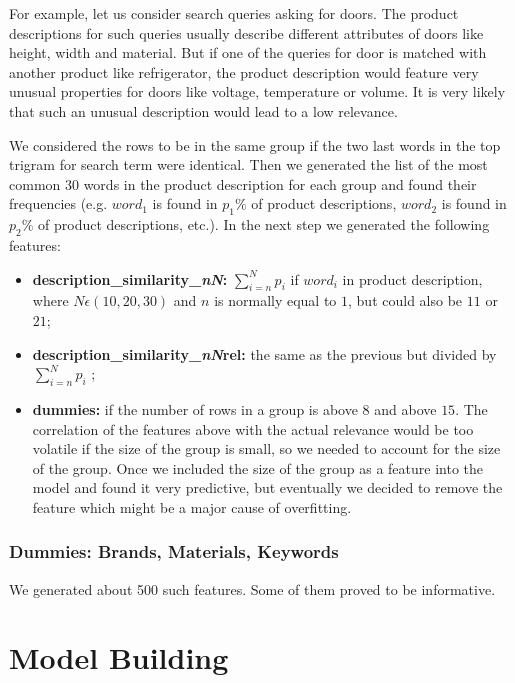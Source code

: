 \documentclass[12pt]{article}
\begin{document}
{{For example, let us consider search queries asking for doors. The product descriptions for such queries usually describe different attributes of doors like height, width and material. But if one of the queries for door is matched with another product like refrigerator, the product description would feature very unusual properties for doors like voltage, temperature or volume. It is very likely that such an unusual description would lead to a low relevance.

We considered the rows to be in the same group if the two last words in the top trigram for search term were identical. Then we generated the list of the most common 30 words in the product description for each group and found their frequencies (e.g. $word_1$ is found in $p_1\%$ of product descriptions, $word_2$ is found in $p_2\%$ of product descriptions, etc.).
In the next step we generated the following features:
\begin{itemize}
\item \textbf{description\_similarity\_\emph{nN}:} $\sum_{i=n}^{N} p_i$ if $word_i$ in product description, where $N\epsilon (10,20,30)$ and $n$ is normally equal to $1$, but could also be $11$ or $21$;
\item \textbf{description\_similarity\_\emph{nN}rel:} the same as the previous but divided by $\sum_{i=n}^{N} p_i$ ;
\item \textbf{dummies:} if the number of rows in a group is above $8$ and above $15$. The correlation of the features above with the actual relevance would be too volatile if the size of the group is small, so we needed to account for the size of the group. Once we included the size of the group as a feature into the model and found it very predictive, but eventually we decided to remove the feature which might be a major cause of overfitting.
\end{itemize}

\subsubsection{Dummies: Brands, Materials, Keywords}
\label{subsubsec:dummies_IandK}
We generated about 500 such features. Some of them proved to be informative.









\section{Model Building}
}}
\end{document}
